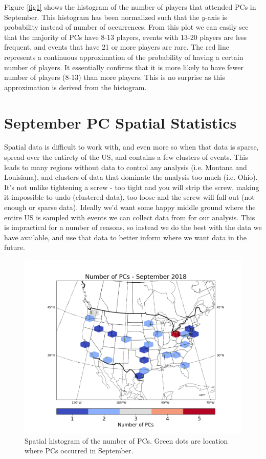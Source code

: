 \documentclass[11pt,twocolumn]{article}
\begin{document}
Figure \ref{fig1} shows the histogram of the number of players that attended PCs in September. This histogram has been normalized such that the $y$-axis is probability instead of number of occurrences. From this plot we can easily see that the majority of PCs have 8-13 players, events with 13-20 players are less frequent, and events that have 21 or more players are rare. The red line represents a continuous approximation of the probability of having a certain number of players. It essentially confirms that it is more likely to have fewer number of players (8-13) than more players. This is no surprise as this approximation is derived from the histogram.

\section*{September PC Spatial Statistics}

Spatial data is difficult to work with, and even more so when that data is sparse, spread over the entirety of the US, and contains a few clusters of events. This leads to many regions without data to control any analysis (i.e. Montana and Louisiana), and clusters of data that dominate the analysis too much (i.e. Ohio). It's not unlike tightening a screw - too tight and you will strip the screw, making it impossible to undo (clustered data), too loose and the screw will fall out (not enough or sparse data). Ideally we'd want some happy middle ground where the entire US is sampled with events we can collect data from for our analysis. This is impractical for a number of reasons, so instead we do the best with the data we have available, and use that data to better inform where we want data in the future. 

\begin{figure}[ht]
	\includegraphics[width=\columnwidth]{../figs/Figure_2.png}
	\caption{Spatial histogram of the number of PCs. Green dots are location where PCs occurred in September.}
	\label{fig2}
\end{figure}
\end{document}
